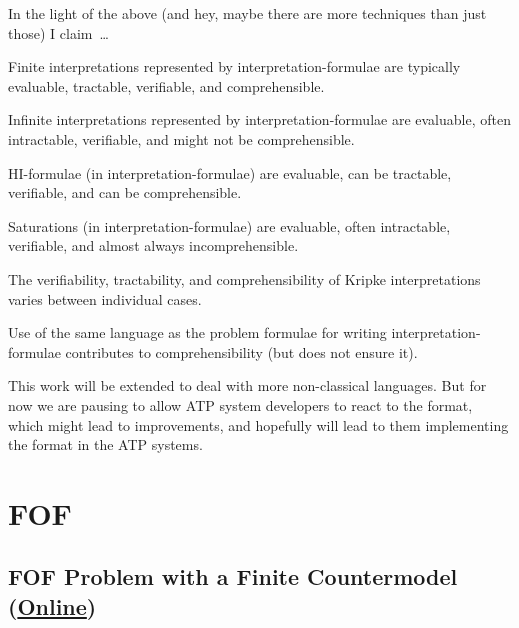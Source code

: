 \documentclass{easychair}
\newenvironment{packed_itemize}{
\vspace*{-0.3em}
\begin{itemize}
\setlength{\partopsep}{0pt}
\setlength{\itemsep}{1pt}
\setlength{\parskip}{0pt}
\setlength{\parsep}{0pt}
}{\end{itemize}}
\begin{document}
In the light of the above (and hey, maybe there are more techniques than just those) I claim~\ldots
\begin{packed_itemize}
\item Finite interpretations represented by interpretation-formulae are typically evaluable,
      tractable, verifiable, and comprehensible.
\item Infinite interpretations represented by interpretation-formulae are evaluable, often 
      intractable, verifiable, and might not be comprehensible.
\item HI-formulae (in interpretation-formulae) are evaluable, can be tractable, verifiable, 
      and can be comprehensible.
\item Saturations (in interpretation-formulae) are evaluable, often intractable, verifiable, 
      and almost always incomprehensible.
\item The verifiability, tractability, and comprehensibility of Kripke interpretations varies
      between individual cases.
\item Use of the same language as the problem formulae for writing interpretation-formulae
      contributes to comprehensibility (but does not ensure it).
\end{packed_itemize}

This work will be extended to deal with more non-classical languages.
But for now we are pausing to allow ATP system developers to react to the format, which might 
lead to improvements, and hopefully will lead to them implementing the format in the ATP systems.



\appendix

\newpage
\section{FOF}
\label{FOF}

\subsection{FOF Problem with a Finite Countermodel
(\href{https://raw.githubusercontent.com/GeoffsPapers/InterpretationFormat/master/Examples/FOF_Finite.p}{Online})}
\label{FOF_Finite.p}
\begin{small}

\end{small}
\end{document}
